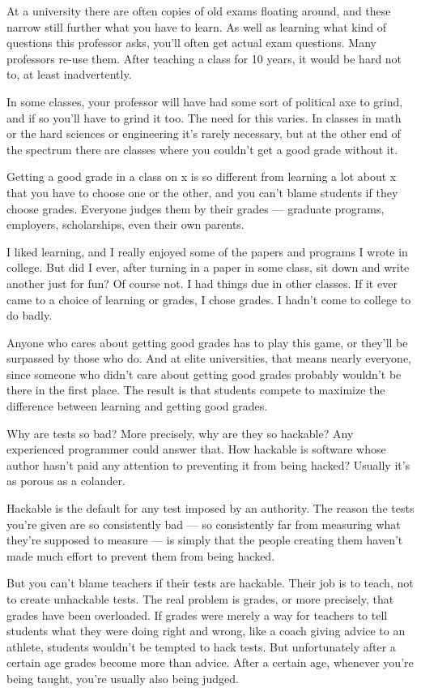 \documentclass[12pt]{book}
\begin{document}
At a university there are often copies of old exams floating around, and
these narrow still further what you have to learn. As well as learning
what kind of questions this professor asks, you'll often get actual exam
questions. Many professors re-use them. After teaching a class for 10
years, it would be hard not to, at least inadvertently.

In some classes, your professor will have had some sort of political axe
to grind, and if so you'll have to grind it too. The need for this
varies. In classes in math or the hard sciences or engineering it's
rarely necessary, but at the other end of the spectrum there are classes
where you couldn't get a good grade without it.

Getting a good grade in a class on x is so different from learning a lot
about x that you have to choose one or the other, and you can't blame
students if they choose grades. Everyone judges them by their grades ---
graduate programs, employers, scholarships, even their own parents.

I liked learning, and I really enjoyed some of the papers and programs I
wrote in college. But did I ever, after turning in a paper in some
class, sit down and write another just for fun? Of course not. I had
things due in other classes. If it ever came to a choice of learning or
grades, I chose grades. I hadn't come to college to do badly.

Anyone who cares about getting good grades has to play this game, or
they'll be surpassed by those who do. And at elite universities, that
means nearly everyone, since someone who didn't care about getting good
grades probably wouldn't be there in the first place. The result is that
students compete to maximize the difference between learning and getting
good grades.

Why are tests so bad? More precisely, why are they so hackable? Any
experienced programmer could answer that. How hackable is software whose
author hasn't paid any attention to preventing it from being hacked?
Usually it's as porous as a colander.

Hackable is the default for any test imposed by an authority. The reason
the tests you're given are so consistently bad --- so consistently far
from measuring what they're supposed to measure --- is simply that the
people creating them haven't made much effort to prevent them from being
hacked.

But you can't blame teachers if their tests are hackable. Their job is
to teach, not to create unhackable tests. The real problem is grades, or
more precisely, that grades have been overloaded. If grades were merely
a way for teachers to tell students what they were doing right and
wrong, like a coach giving advice to an athlete, students wouldn't be
tempted to hack tests. But unfortunately after a certain age grades
become more than advice. After a certain age, whenever you're being
taught, you're usually also being judged.
\end{document}
